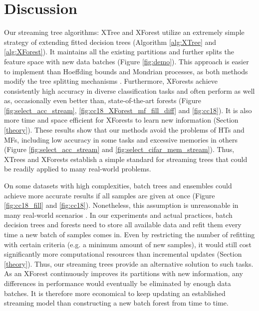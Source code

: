 \section{Discussion}
\label{discussion}
Our streaming tree algorithms: XTree and XForest utilize an extremely simple strategy of extending fitted decision trees (Algorithm \ref{alg:XTree} and \ref{alg:XForest}). It maintains all the existing partitions and further splits the feature space with new data batches (Figure \ref{fig:demo}). This approach is easier to implement than Hoeffding bounds and Mondrian processes, as both methods modify the tree splitting mechanisms \citep{hoeffding_probability_1994, domingos_mining_2000, roy_mondrian_2009, lakshminarayanan_mondrian_2014}. 
Furthermore, XForests achieve consistently high accuracy in diverse classification tasks and often perform as well as, occasionally even better than, state-of-the-art forests (Figure \ref{fig:select_acc_stream}, \ref{fig:cc18_XForest_mf_fill_diff} and \ref{fig:cc18}). It is also more time and space efficient for XForests to learn new information (Section \ref{theory}).
These results show that our methods avoid the problems of HTs and MFs, including low accuracy in some tasks and excessive memories in others (Figure \ref{fig:select_acc_stream} and \ref{fig:select_cifar_mem_stream}). Thus, XTrees and XForests establish a simple standard for streaming trees that could be readily applied to many real-world problems.

On some datasets with high complexities, batch trees and ensembles could achieve more accurate results if all samples are given at once (Figure \ref{fig:cc18_fill} and \ref{fig:cc18}). Nonetheless, this assumption is unreasonable in many real-world scenarios \citep{abdulsalam_streaming_2007, liu_isolation_2008}. In our experiments and actual practices, batch decision trees and forests need to store all available data and refit them every time a new batch of samples comes in. Even by restricting the number of refitting with certain criteria (e.g. a minimum amount of new samples), it would still cost significantly more computational resources than incremental updates (Section \ref{theory}). Thus, our streaming trees provide an alternative solution to such tasks. As an XForest continuously improves its partitions with new information, any differences in performance would eventually be eliminated by enough data batches. It is therefore more economical to keep updating an established streaming model than constructing a new batch forest from time to time.

